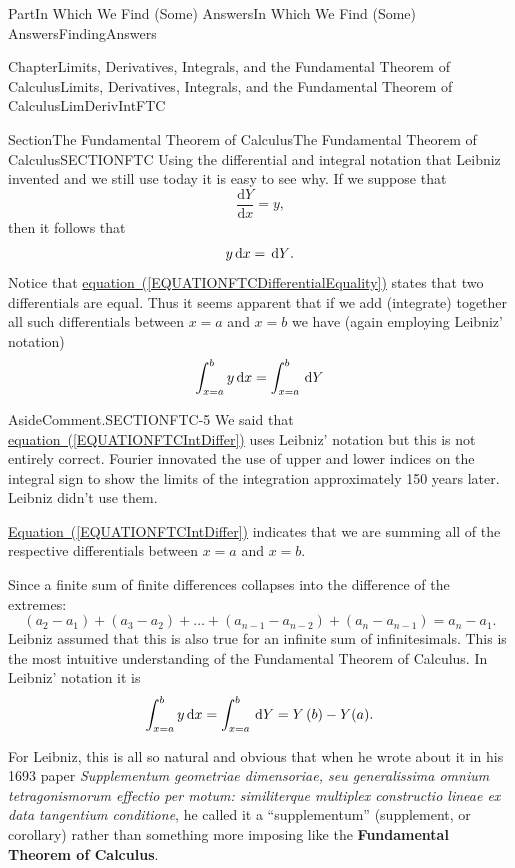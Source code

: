 \documentclass[oneside,10pt,]{book}
\newcommand{\xreffont}{\relax}
\newcommand{\terminology}[1]{\textbf{#1}}
\numberwithin{equation}{part}
\newcommand{\dx}[1]{\,{\rm d}#1}
\newcommand{\dfdx}[2]{\frac{\text{d}{#1}}{\text{d}{#2}}}
\begin{document}
\begin{partptx}{Part}{In Which We Find (Some) Answers}{}{In Which We Find (Some) Answers}{}{}{FindingAnswers}
\begin{chapterptx}{Chapter}{Limits, Derivatives, Integrals, and the Fundamental Theorem of Calculus}{}{Limits, Derivatives, Integrals, and the Fundamental Theorem of Calculus}{}{}{LimDerivIntFTC}
\begin{sectionptx}{Section}{The Fundamental Theorem of Calculus}{}{The Fundamental Theorem of Calculus}{}{}{SECTIONFTC}
Using the differential and integral notation that Leibniz invented and we still use today it is easy to see why. If we suppose that%
\begin{equation*}
\dfdx{Y}{x}=y\text{,}
\end{equation*}
then it follows that%
\begin{equation}
y\dx{x}=\dx{Y} \text{.}\label{EQUATIONFTCDifferentialEquality}
\end{equation}
Notice that \hyperref[EQUATIONFTCDifferentialEquality]{equation~({\xreffont\ref{EQUATIONFTCDifferentialEquality}})} states that two differentials are equal. Thus it seems apparent that if we add (integrate) together all such differentials between \(x=a\) and \(x=b\) we have (again employing Leibniz' notation)%
\begin{equation}
\int^b_{x=a}{y\dx{x}}=\int^b_{x=a}{\dx{Y}}\label{EQUATIONFTCIntDiffer}
\end{equation}
%
\begin{aside}{Aside}{Comment.}{SECTIONFTC-5}%
We said that \hyperref[EQUATIONFTCIntDiffer]{equation~({\xreffont\ref{EQUATIONFTCIntDiffer}})} uses Leibniz' notation but this is not entirely correct. Fourier innovated the use of upper and lower indices on the integral sign to show the limits of the integration approximately 150 years later. Leibniz didn't use them.%
\par
\hyperref[EQUATIONFTCIntDiffer]{Equation~({\xreffont\ref{EQUATIONFTCIntDiffer}})} indicates that we are summing all of the respective differentials between \(x=a\) and \(x=b\).%
\end{aside}
Since  a finite sum of finite differences collapses into the difference of the extremes:%
\begin{equation*}
\left(a_2-a_1\right)+\left(a_3-a_2\right)+\dots
+\left(a_{n-1}-a_{n-2}\right)+\left(a_n-a_{n-1}\right)=a_n-a_1\text{.}
\end{equation*}
Leibniz assumed that this is also true for an infinite sum of infinitesimals. This is the most intuitive understanding of the Fundamental Theorem of Calculus. In Leibniz' notation it is%
\begin{equation}
\int^b_{x=a}{y\dx{x}}=\int^b_{x=a}{\dx{Y}}=Y\left(b\right)-Y(a)\text{.}\label{EQUATIONFTCLeibniz}
\end{equation}
%
\par
For Leibniz, this is all so natural and obvious that when he wrote about it in his 1693 paper \textit{Supplementum geometriae dimensoriae, seu generalissima omnium tetragonismorum effectio per motum: similiterque multiplex constructio lineae ex data tangentium conditione},     he called it a ``supplementum'' (supplement, or corollary) rather than something more  imposing \textemdash{} like the \terminology{Fundamental Theorem of Calculus}.%

\end{sectionptx}
\end{chapterptx}
\end{partptx}
\end{document}
